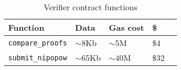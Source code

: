 \begin{table}[ht]
  \centering
  \caption{Verifier contract functions}
  \label{tbl:gascosts}
  \begin{tabular}{l|l|l|ll}
    \hline
    Function & Data & Gas cost & \$ \\ \hline
    \texttt{compare\_proofs} & $\sim$8Kb & $\sim$5M & \$4 \\ \hline
    \texttt{submit\_nipopow} & $\sim$65Kb & $\sim$40M & \$32 \\ \hline
  \end{tabular}
\end{table}

